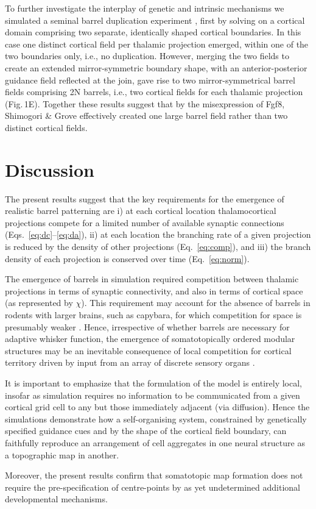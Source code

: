 \documentclass[9pt,twocolumn,twoside,lineno]{pnas-new}
\begin{document}
To further investigate the interplay of genetic and intrinsic mechanisms we simulated a seminal barrel duplication experiment \cite{shimogori_fibroblast_2005},  first by solving on a cortical domain comprising two separate, identically shaped cortical boundaries. In this case one distinct cortical field per thalamic projection emerged, within one of the two boundaries only, i.e., no duplication. However, merging the two fields to create an extended mirror-symmetric boundary shape, with an anterior-posterior guidance field reflected at the join, gave rise to two mirror-symmetrical barrel fields comprising 2N barrels, i.e., two cortical fields for each thalamic projection (Fig.\,1E). Together these results suggest that by the misexpression of Fgf8, Shimogori \& Grove \citep{shimogori_fibroblast_2005} effectively created one large barrel field rather than two distinct cortical fields.

\section*{Discussion}

The present results suggest that the key requirements for the emergence of realistic barrel patterning are i) at each cortical location thalamocortical projections compete for a limited number of available synaptic connections (Eqs.~\ref{eq:dc}--\ref{eq:da}), ii) at each location the branching rate of a given projection is reduced by the density of other projections (Eq.~\ref{eq:comp}), and iii) the branch density of each projection is conserved over time (Eq.~\ref{eq:norm}).

The emergence of barrels in simulation required competition between thalamic projections in terms of synaptic connectivity, and also in terms of cortical space (as represented by $\chi$). This requirement may account for the absence of barrels in rodents with larger brains, such as capybara, for which competition for space is presumably weaker \citep{Woolsey1975}. Hence, irrespective of whether barrels are necessary for adaptive whisker function, the emergence of somatotopically ordered modular structures may be an inevitable consequence of local competition for cortical territory driven by input from an array of discrete sensory organs \citep{purves_iterated_1992}.

It is important to emphasize that the formulation of the model is entirely local, insofar as simulation requires no information to be communicated from a given cortical grid cell to any but those immediately adjacent (via diffusion). Hence the simulations demonstrate how a self-organising system, constrained by genetically specified guidance cues and by the shape of the cortical field boundary, can faithfully reproduce an arrangement of cell aggregates in one neural structure as a topographic map in another.

Moreover, the present results confirm that somatotopic map formation does not require the pre-specification of centre-points by as yet undetermined additional developmental mechanisms.



\end{document}

